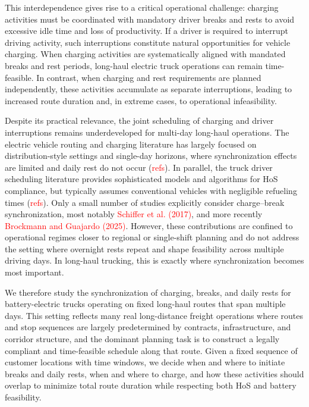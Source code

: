 \documentclass[trsc,dblanonrev]{informs4}
\newcommand{\red}[1]{{\textcolor{red}{#1}}}
\begin{document}
    This interdependence gives rise to a critical operational challenge: charging activities must be coordinated with mandatory driver breaks and rests to avoid excessive idle time and loss of productivity. If a driver is required to interrupt driving activity, such interruptions constitute natural opportunities for vehicle charging. When charging activities are systematically aligned with mandated breaks and rest periods, long-haul electric truck operations can remain time-feasible. In contrast, when charging and rest requirements are planned independently, these activities accumulate as separate interruptions, leading to increased route duration and, in extreme cases, to operational infeasibility.

    Despite its practical relevance, the joint scheduling of charging and driver interruptions remains underdeveloped for multi-day long-haul operations. The electric vehicle routing and charging literature has largely focused on distribution-style settings and single-day horizons, where synchronization effects are limited and daily rest do not occur (\red{refs}). In parallel, the truck driver scheduling literature provides sophisticated models and algorithms for HoS compliance, but typically assumes conventional vehicles with negligible refueling times (\red{refs}). Only a small number of studies explicitly consider charge–break synchronization, most notably \red{Schiffer et al. (2017)}, and more recently \red{Brockmann and Guajardo (2025)}. However, these contributions are confined to operational regimes closer to regional or single-shift planning and do not address the setting where overnight rests repeat and shape feasibility across multiple driving days. In long-haul trucking, this is exactly where synchronization becomes most important.

    We therefore study the synchronization of charging, breaks, and daily rests for battery-electric trucks operating on fixed long-haul routes that span multiple days. This setting reflects many real long-distance freight operations where routes and stop sequences are largely predetermined by contracts, infrastructure, and corridor structure, and the dominant planning task is to construct a legally compliant and time-feasible schedule along that route. Given a fixed sequence of customer locations with time windows, we decide when and where to initiate breaks and daily rests, when and where to charge, and how these activities should overlap to minimize total route duration while respecting both HoS and battery feasibility.
\end{document}

